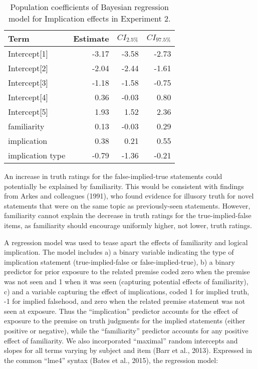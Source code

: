 \documentclass[10pt, letterpaper]{article}
\newenvironment{CodeChunk}{}{}
\begin{document}
\begin{CodeChunk}
\begin{table}

\caption{\label{tab:make-tables}Population coefficients of Bayesian regression model for Implication effects in Experiment 2.}
\centering
\begin{tabular}[t]{lrrr}
\toprule
Term & Estimate & $CI_{2.5\%}$ & $CI_{97.5\%}$\\
\midrule
Intercept[1] & -3.17 & -3.58 & -2.73\\
Intercept[2] & -2.04 & -2.44 & -1.61\\
Intercept[3] & -1.18 & -1.58 & -0.75\\
Intercept[4] & 0.36 & -0.03 & 0.80\\
Intercept[5] & 1.93 & 1.52 & 2.36\\
\addlinespace
familiarity & 0.13 & -0.03 & 0.29\\
implication & 0.38 & 0.21 & 0.55\\
implication type & -0.79 & -1.36 & -0.21\\
\bottomrule
\end{tabular}
\end{table}

\end{CodeChunk}

An increase in truth ratings for the false-implied-true statements could
potentially be explained by familiarity. This would be consistent with
findings from Arkes and colleagues (1991), who found evidence for
illusory truth for novel statements that were on the same topic as
previously-seen statements. However, familiarity cannot explain the
decrease in truth ratings for the true-implied-false items, as
familiarity should encourage uniformly higher, not lower, truth ratings.

A regression model was used to tease apart the effects of familiarity
and logical implication. The model includes a) a binary variable
indicating the type of implication statement (true-implied-false or
false-implied-true), b) a binary predictor for prior exposure to the
related premise coded zero when the premise was not seen and 1 when it
was seen (capturing potential effects of familiarity), c) and a variable
capturing the effect of implications, coded 1 for implied truth, -1 for
implied falsehood, and zero when the related premise statement was not
seen at exposure. Thus the ``implication'' predictor accounts for the
effect of exposure to the premise on truth judgments for the implied
statements (either positive or negative), while the ``familiarity''
predictor accounts for any positive effect of familiarity. We also
incorporated ``maximal'' random intercepts and slopes for all terms
varying by subject and item (Barr et al., 2013). Expressed in the common
``lme4'' syntax (Bates et al., 2015), the regression model:
\end{document}
